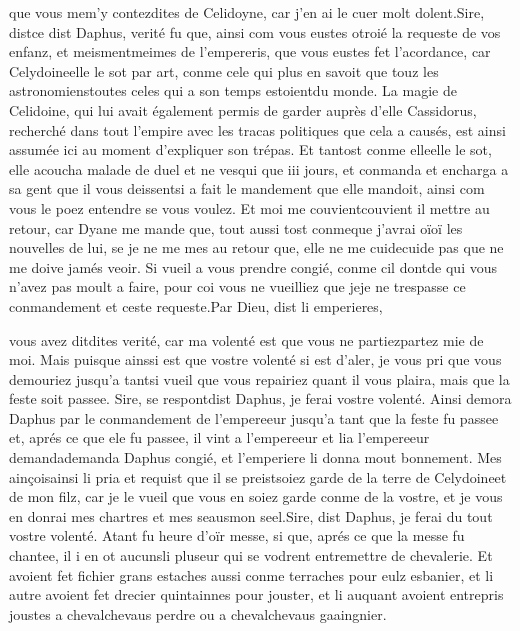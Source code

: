 \documentclass{article}
\begin{document}
\begin{pages}
         que vous mem'y 
      contezdites de 
      Celidoyne, car j’en ai le cuer molt dolent.Sire, distce dist 
      Daphus, verité fu que, ainsi com vous eustes otroié la requeste de vos enfanz, 
      et meismentmeimes de l’empereris, 
      que vous eustes fet l’acordance, car 
      Celydoineelle 
      le sot par art, 
      conme cele qui plus en savoit que touz les astronomienstoutes celes 
      qui a son temps estoientdu monde.
      La magie de Celidoine, qui lui avait également permis
         de garder auprès d'elle Cassidorus, recherché dans tout l'empire avec les tracas politiques que cela a causés, 
         est ainsi assumée ici au moment d'expliquer son trépas.
      Et tantost conme elleelle le sot, elle acoucha malade 
      de duel et ne vesqui que iii jours, 
      et conmanda et encharga a sa gent que il vous deissentsi a fait le mandement 
      que elle mandoit, ainsi com vous 
         le poez entendre 
      se vous voulez. 
      Et moi me 
      couvientcouvient il mettre au retour, 
      car Dyane 
      me mande que, tout aussi tost conmeque j’avrai 
         oïoï les nouvelles de lui, se je ne 
      me mes au retour que, 
      elle ne 
      me 
      cuidecuide pas que ne me doive jamés veoir. Si vueil a vous prendre congié, 
      conme cil dontde qui vous n’avez pas moult a faire, 
         pour coi vous ne vueilliez que 
         jeje ne trespasse ce conmandement et ceste requeste.Par Dieu, dist li emperieres, 
      
         vous 
         avez ditdites verité, 
      car ma volenté est que vous ne 
         partiezpartez mie de moi. Mais puisque ainssi est que vostre volenté si est d’aler, 
         je vous pri que vous demouriez jusqu’a tantsi vueil que vous repairiez quant il vous plaira, mais 
      que la feste soit passee.
   Sire, se respontdist 
      Daphus, je ferai vostre volenté.
   Ainsi demora Daphus par le conmandement de l’empereeur 
      jusqu’a tant que la feste fu passee et, aprés ce que ele fu passee, il vint a 
         l’empereeur et 
      lia l'empereeur 
      demandademanda Daphus congié, 
      et l’emperiere li donna mout bonnement. 
      Mes ainçoisainsi li pria et requist que 
   il se preistsoiez garde de la terre de 
    Celydoineet de mon filz,
       car je le vueil que vous en soiez garde conme de la 
          vostre, et je vous en 
       donrai mes chartres et mes seausmon seel.Sire, dist Daphus, je ferai du tout vostre volenté.
   Atant fu heure d’oïr messe, si que, aprés 
   ce que la messe 
      fu chantee, il i en ot 
   aucunsli pluseur qui se vodrent entremettre de chevalerie. 
   Et avoient fet fichier grans estaches aussi conme terraches pour eulz esbanier, 
   et li autre avoient fet drecier quintainnes pour jouster, 
   et li auquant avoient entrepris joustes a 
   chevalchevaus perdre ou 
   a chevalchevaus gaaingnier. \pend
         

\end{pages}
\end{document}
